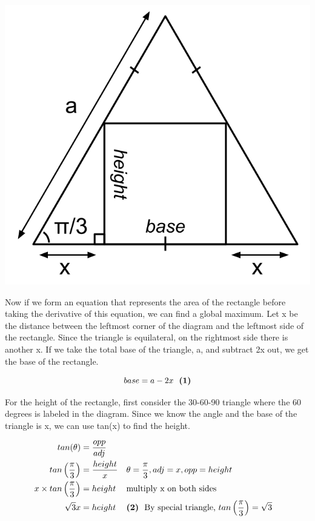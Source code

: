 \documentclass[12pt]{book}
\begin{document}
\begin{enumerate}
\begin{center}
    \includegraphics[scale = 0.32]{Q24 Diagram.png}
\end{center}

Now if we form an equation that represents the area of the rectangle 
before taking the derivative of this equation, we can find a global 
maximum. Let x be the distance between the leftmost corner of the diagram and the 
leftmost side of the rectangle. Since the triangle is equilateral, 
on the rightmost side there is another x. If we take the total base 
of the triangle, a, and subtract 2x out, we get the base of the rectangle.

$$base = a - 2x \text{\space \space \textbf{(1)}}$$

For the height of the rectangle, first consider the 30-60-90 triangle 
where the 60 degrees is labeled in the diagram. Since we know the angle 
and the base of the triangle is x, we can use tan(x) to find the height.

\addtolength{\jot}{-0.6em}
\begin{align*}
    tan(\theta) &= \dfrac{opp}{adj} \\
    tan \left( \dfrac{\pi}{3} \right) &= \dfrac{height}{x} && \theta = \dfrac{\pi}{3}, adj = x, opp=height \\
    x \times tan \left( \dfrac{\pi}{3} \right) &= height && \text{multiply x on both sides} \\
    \sqrt3 x&= height && \textbf{(2)} \text{\space \space By special triangle, } tan \left( \dfrac{\pi}{3} \right) = \sqrt3 \\
\end{align*}


\end{enumerate}
\end{document}
